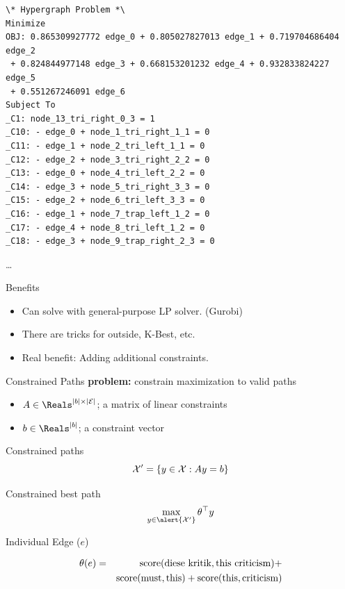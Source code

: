 \documentclass{beamer}
\def\im#1#2{
  \node(#1) [scale=#2]{\pgfbox[center,top]{\pgfuseimage{#1}}
};}
\newcommand{\air}{\vspace{0.5cm}}
\begin{document}
\begin{frame}[fragile]
  \begin{small}
\begin{verbatim}
\* Hypergraph Problem *\
Minimize
OBJ: 0.865309927772 edge_0 + 0.805027827013 edge_1 + 0.719704686404 edge_2
 + 0.824844977148 edge_3 + 0.668153201232 edge_4 + 0.932833824227 edge_5
 + 0.551267246091 edge_6
Subject To
_C1: node_13_tri_right_0_3 = 1
_C10: - edge_0 + node_1_tri_right_1_1 = 0
_C11: - edge_1 + node_2_tri_left_1_1 = 0
_C12: - edge_2 + node_3_tri_right_2_2 = 0
_C13: - edge_0 + node_4_tri_left_2_2 = 0
_C14: - edge_3 + node_5_tri_right_3_3 = 0
_C15: - edge_2 + node_6_tri_left_3_3 = 0
_C16: - edge_1 + node_7_trap_left_1_2 = 0
_C17: - edge_4 + node_8_tri_left_1_2 = 0
_C18: - edge_3 + node_9_trap_right_2_3 = 0
\end{verbatim}
    \ldots
  \end{small}
\end{frame}


\begin{frame}{Benefits}
  \begin{itemize}
  \item Can solve with general-purpose LP solver. (Gurobi)
    \air 

  \item There are tricks for outside, K-Best, etc. 
    \air 
  \item Real benefit: Adding additional constraints.
  \end{itemize}
\end{frame}


\begin{frame}[label=current]{Constrained Paths}
  \textbf{problem:} constrain maximization to valid paths
  \begin{itemize}
  \item $A \in \Reals^{|b| \times |{\cal E}|}$; a matrix of linear constraints
  \item $b \in \Reals^{|b|}$; a constraint vector
  \end{itemize}
  
  \air 
  Constrained paths
  \[ {\cal X}' = \{y \in {\cal X} : A y = b \} \]

  Constrained best path
  \[   \max_{ y \in \alert{{\cal X}'}} \theta^{\top} y  \]
\end{frame}

\begin{frame}[t]{Individual Edge ($e$)}
  \begin{figure}
    \centering
  \end{figure}
  \vspace{3cm}

  \begin{eqnarray*}
 \theta(e) &=& \hbox{score}(\hbox{diese kritik}, \hbox{this criticism}) + \\
&&\hbox{score}(\hbox{must}, \hbox{this}) + \hbox{score}(\hbox{this}, \hbox{criticism})
  \end{eqnarray*}

\end{frame}
\end{document}
